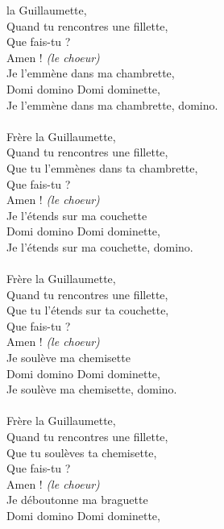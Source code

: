
 la Guillaumette,
\\Quand tu rencontres une fillette,
\\Que fais-tu ?
\\Amen ! \textit{(le choeur)}
\\Je l'emmène dans ma chambrette,
\\Domi domino Domi dominette,
\\Je l'emmène dans ma chambrette, domino.
\\\\Frère la Guillaumette,
\\Quand tu rencontres une fillette,
\\Que tu l'emmènes dans ta chambrette,
\\Que fais-tu ?
\\Amen ! \textit{(le choeur)}
\\Je l'étends sur ma couchette
\\Domi domino Domi dominette,
\\Je l'étends sur ma couchette, domino.
\\\\Frère la Guillaumette,
\\Quand tu rencontres une fillette,
\\Que tu l'étends sur ta couchette,
\\Que fais-tu ?
\\Amen ! \textit{(le choeur)}
\\Je soulève ma chemisette
\\Domi domino Domi dominette,
\\Je soulève ma chemisette, domino.
\\\\Frère la Guillaumette,
\\Quand tu rencontres une fillette,
\\Que tu soulèves ta chemisette,
\\Que fais-tu ?
\\Amen ! \textit{(le choeur)}
\\Je déboutonne ma braguette
\\Domi domino Domi dominette,
